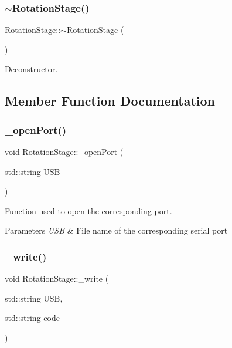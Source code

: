\subsubsection{\texorpdfstring{$\sim$\+Rotation\+Stage()}{~RotationStage()}}
{\footnotesize\ttfamily Rotation\+Stage\+::$\sim$\+Rotation\+Stage (\begin{DoxyParamCaption}{ }\end{DoxyParamCaption})\hspace{0.3cm}{\ttfamily [inline]}}



Deconstructor. 



\subsection{Member Function Documentation}
\mbox{\label{class_rotation_stage_a8c120bd6de719b9aee263b421850bdaf}} 
\subsubsection{\texorpdfstring{\+\_\+open\+Port()}{\_openPort()}}
{\footnotesize\ttfamily void Rotation\+Stage\+::\+\_\+open\+Port (\begin{DoxyParamCaption}\item[{std\+::string}]{U\+SB }\end{DoxyParamCaption})\hspace{0.3cm}{\ttfamily [private]}}



Function used to open the corresponding port. 


\begin{DoxyParams}{Parameters}
{\em U\+SB} & File name of the corresponding serial port \\
\hline
\end{DoxyParams}
\mbox{\label{class_rotation_stage_afb2393a3cac78176407e8e2d31a6cef4}} 
\subsubsection{\texorpdfstring{\+\_\+write()}{\_write()}}
{\footnotesize\ttfamily void Rotation\+Stage\+::\+\_\+write (\begin{DoxyParamCaption}\item[{std\+::string}]{U\+SB,  }\item[{std\+::string}]{code }\end{DoxyParamCaption})\hspace{0.3cm}{\ttfamily [private]}}



